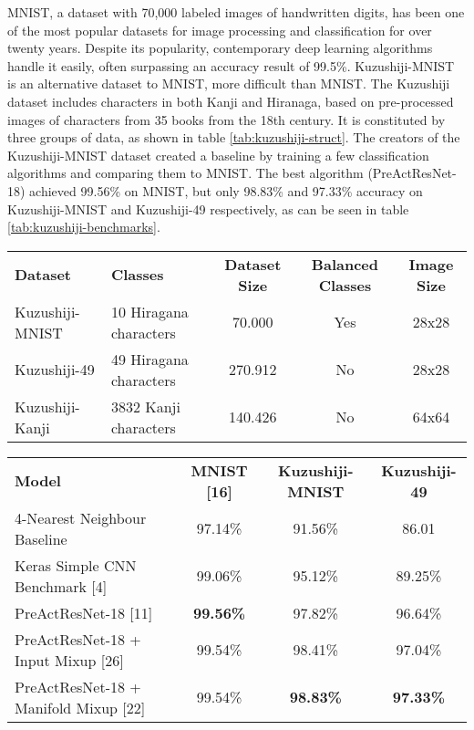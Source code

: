 MNIST, a dataset with 70,000 labeled images of handwritten digits, has been one of the most popular datasets for image processing and classification for over twenty years. Despite its popularity, contemporary deep learning algorithms handle it easily, often surpassing an accuracy result of 99.5\%. Kuzushiji-MNIST \cite{Clanuwat2018-vm} is an alternative dataset to MNIST, more difficult than MNIST. The Kuzushiji dataset includes characters in both Kanji and Hiranaga, based on pre-processed images of characters from 35 books from the 18th century. It is constituted by three groups of data, as shown in table \ref{tab:kuzushiji-struct}. The creators of the Kuzushiji-MNIST dataset created a baseline by training a few classification algorithms and comparing them to MNIST. The best algorithm (PreActResNet-18) achieved 99.56\% on MNIST, but only 98.83\% and 97.33\% accuracy on Kuzushiji-MNIST and Kuzushiji-49 respectively, as can be seen in table \ref{tab:kuzushiji-benchmarks}.

\begin{table*}[ht!]
	\begin{tabular}{llccc}
		\rowcolor[HTML]{EFEFEF}
		\textbf{Dataset} & \textbf{Classes}       & \textbf{Dataset Size} & \textbf{Balanced Classes} & \textbf{Image Size} \\
		Kuzushiji-MNIST  & 10 Hiragana characters & 70.000                & Yes                       & 28x28               \\
		Kuzushiji-49     & 49 Hiragana characters & 270.912               & No                        & 28x28               \\
		Kuzushiji-Kanji  & 3832 Kanji characters  & 140.426               & No                        & 64x64
	\end{tabular}
	\caption{Description of the structure of the Kuzushiji-MNIST dataset from \cite{Clanuwat2018-vm}.}
	\label{tab:kuzushiji-struct}
\end{table*}

\begin{table*}[ht!]
	\begin{tabular}{lccc}
		\rowcolor[HTML]{EFEFEF}
		\textbf{Model}                            & \textbf{MNIST {[}16{]}} & \textbf{Kuzushiji-MNIST} & \textbf{Kuzushiji-49} \\
		4-Nearest Neighbour Baseline              & 97.14\%                 & 91.56\%                  & 86.01                 \\
		Keras Simple CNN Benchmark {[}4{]}        & 99.06\%                 & 95.12\%                  & 89.25\%               \\
		PreActResNet-18 {[}11{]}                  & \textbf{99.56\%}        & 97.82\%                  & 96.64\%               \\
		PreActResNet-18 + Input Mixup {[}26{]}    & 99.54\%                 & 98.41\%                  & 97.04\%               \\
		PreActResNet-18 + Manifold Mixup {[}22{]} & 99.54\%                 & \textbf{98.83\%}         & \textbf{97.33\%}
	\end{tabular}
	\caption{Benchmarks on the Kuzushiji-MNIST dataset from \cite{Clanuwat2018-vm}.}
	\label{tab:kuzushiji-benchmarks}
\end{table*}